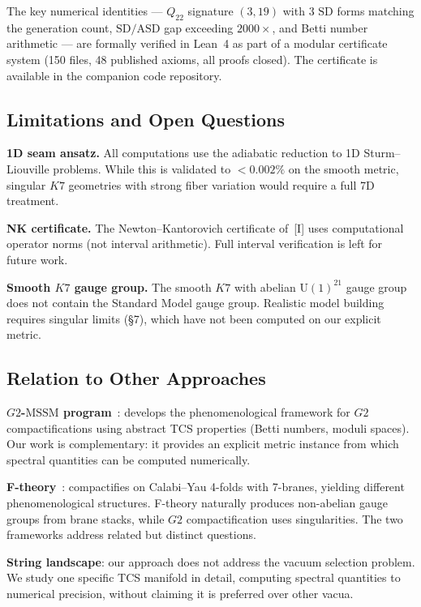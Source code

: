 \documentclass[11pt,a4paper]{article}
\newcommand{\Gtwo}{\mathrm{G}_2}
\newcommand{\Kseven}{K_7}
\newcommand{\U}{\mathrm{U}}
\newcommand{\SD}{\mathrm{SD}}
\newcommand{\ASD}{\mathrm{ASD}}
\newcommand{\MSSM}{\mathrm{MSSM}}
\theoremstyle{remark}
\def\Gtwo{G2}%
\def\Kseven{K7}%
\begin{document}
The key numerical identities --- $Q_{22}$ signature $(3, 19)$ with 3 $\SD$ forms matching the
generation count, $\SD/\ASD$ gap exceeding $2000\times$, and Betti number arithmetic --- are
formally verified in Lean~4 as part of a modular certificate system (150 files,
48 published axioms, all proofs closed). The certificate is available in the
companion code repository.

\subsection{Limitations and Open Questions}

\textbf{1D seam ansatz.} All computations use the adiabatic reduction to 1D
Sturm--Liouville problems. While this is validated to $< 0.002\%$ on the smooth metric,
singular $\Kseven$ geometries with strong fiber variation would require a full 7D treatment.

\textbf{NK certificate.} The Newton--Kantorovich certificate of~[I] uses computational
operator norms (not interval arithmetic). Full interval verification is left for
future work.

\textbf{Smooth $\Kseven$ gauge group.} The smooth $\Kseven$ with abelian $\U(1)^{21}$ gauge group
does not contain the Standard Model gauge group. Realistic model building requires
singular limits (\S7), which have not been computed on our explicit metric.

\subsection{Relation to Other Approaches}

\textbf{$\Gtwo$-$\MSSM$ program}~\cite{ref2,ref3,ref4}: develops the phenomenological
framework for $\Gtwo$ compactifications using abstract TCS properties (Betti numbers,
moduli spaces). Our work is complementary: it provides an explicit metric instance
from which spectral quantities can be computed numerically.

\textbf{F-theory}~\cite{ref12}: compactifies on Calabi--Yau 4-folds with 7-branes,
yielding different phenomenological structures. F-theory naturally produces non-abelian gauge
groups from brane stacks, while $\Gtwo$ compactification uses singularities. The two
frameworks address related but distinct questions.

\textbf{String landscape}: our approach does not address the vacuum selection problem.
We study one specific TCS manifold in detail, computing spectral quantities
to numerical precision, without claiming it is preferred over other vacua.
\end{document}

